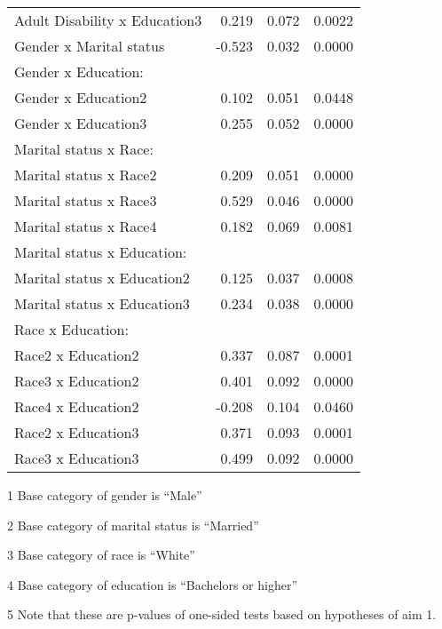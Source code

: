 \begin{table}[H]
\begin{threeparttable}
\begin{tabular}{lrcl}
  \hspace{5pt}   Adult Disability x Education3 		& 0.219		& 0.072 & 0.0022 \\ 
  Gender x Marital status 				& -0.523 	& 0.032 & 0.0000 \\ 
Gender x Education: & & & \\
  \hspace{5pt}   Gender x Education2 			& 0.102		& 0.051 & 0.0448 \\ 
  \hspace{5pt}   Gender x Education3 			& 0.255		& 0.052 & 0.0000 \\ 
Marital status x Race: & & & \\
  \hspace{5pt}   Marital status x Race2 		& 0.209		& 0.051 & 0.0000 \\ 
  \hspace{5pt}   Marital status x Race3 		& 0.529		& 0.046 & 0.0000 \\ 
  \hspace{5pt}   Marital status x Race4 		& 0.182		& 0.069 & 0.0081 \\ 
Marital status x Education: & & & \\
  \hspace{5pt}   Marital status x Education2 		& 0.125		& 0.037 & 0.0008 \\ 
  \hspace{5pt}   Marital status x Education3 		& 0.234		& 0.038 & 0.0000 \\ 
Race x Education: & & & \\
  \hspace{5pt}   Race2 x Education2 			& 0.337		& 0.087 & 0.0001 \\ 
  \hspace{5pt}   Race3 x Education2 			& 0.401		& 0.092 & 0.0000 \\ 
  \hspace{5pt}   Race4 x Education2 			& -0.208 	& 0.104 & 0.0460 \\ 
  \hspace{5pt}   Race2 x Education3 			& 0.371		& 0.093 & 0.0001 \\ 
  \hspace{5pt}   Race3 x Education3 			& 0.499		& 0.092 & 0.0000 \\ 
  \hline
\end{tabular}
\begin{tablenotes}\footnotesize
\item[1] Base category of gender is ``Male''
\item[2] Base category of marital status is ``Married''
\item[3] Base category of race is ``White''
\item[4] Base category of education is ``Bachelors or higher''
\item[5] Note that these are p-values of one-sided tests based on hypotheses of aim 1. 
\end{tablenotes}
\end{threeparttable}
\label{tab:Table2Reg}
\end{table}

